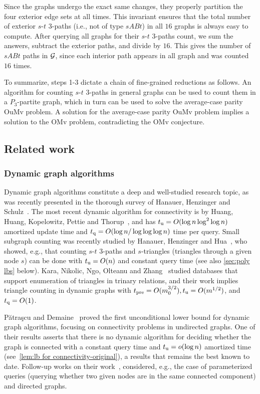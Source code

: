 \documentclass[letter,11pt]{article}
\newcommand{\omv}{\textnormal{\textsf{OMv}}\xspace}
\newcommand{\oumv}{\textnormal{\textsf{OuMv}}\xspace}
\newcommand{\paths}[3]{${#1}$-${#2}$ ${#3}$-paths\xspace}
\newcommand{\tp}{t_{\textnormal{pre}}}
\newcommand{\tu}{t_{\textnormal{u}}}
\newcommand{\tq}{t_{\textnormal{q}}}
\begin{document}
Since the graphs undergo the exact same changes, they properly partition the four exterior edge sets at all times.
This invariant ensures that the total number of exterior \paths st3 (i.e., not of type $sABt$) in all $16$ graphs is always easy to compute.
After querying all graphs for their \paths st3 count, we sum the answers, subtract the exterior paths, and divide by $16$.
This gives the number of $sABt$ paths in $\mathcal{G}$, since each interior path appears in all graph and was counted $16$ times.


\medskip
To summarize, steps 1-3 dictate a chain of fine-grained reductions as follows.
An algorithm for counting \paths st3 in general graphs can be used to count them in a $P_3$-partite graph, which in turn can be used to solve the average-case parity \oumv problem.
A solution for the average-case parity \oumv problem implies a solution to the \omv problem, contradicting the \omv conjecture.


\subsection{Related work}



\subsubsection{Dynamic graph algorithms}

Dynamic graph algorithms constitute a deep and well-studied research topic, 
as was recently presented in the thorough survey of Hanauer, Henzinger and Schulz~\cite{HanauerHS22}.
The most recent dynamic algorithm for connectivity is by
Huang, Huang, Kopelowitz, Pettie and Thorup~\cite{HuangHKPT23}, and has $\tu=O(\log n \log^2\log n)$ amortized update time and $\tq=O(\log n/\log\log\log n)$ time per query.
Small subgraph counting was recently studied by Hanauer, Henzinger and Hua~\cite{HanauerHH22}, 
who showed, e.g., that counting \paths st3 and $s$-triangles (triangles through a given node $s$) can be done with $\tu=O(n)$ and constant query time 
(see also \cref{sec:poly lbs} below).
Kara, Nikolic, Ngo, Olteanu and Zhang~\cite{KaraNNOZ20} studied databases that support enumeration of triangles in trinary relations,
and their work implies triangle counting in dynamic graphs with $\tp=O(m_0^{3/2}), \tu=O(m^{1/2})$, and~$\tq=O(1)$.

P\u{a}tra\c{s}cu and Demaine~\cite{PatrascuD06} 
proved the first unconditional lower bound for dynamic graph algorithms, focusing on connectivity problems in undirected graphs.
One of their results asserts that there is no dynamic algorithm for deciding whether the graph is connected with a constant query time
and $\tu=o(\log n)$	amortized time
(see~\cref{lem:lb for connectivity-original}),
a results that remains the best known to date.
Follow-up works on their work~\cite{PatrascuT11a,CliffordGL15,LarsenY23},
considered, e.g., the case of parameterized queries (querying whether two given nodes are in the same connected component) and directed graphs.
\end{document}
